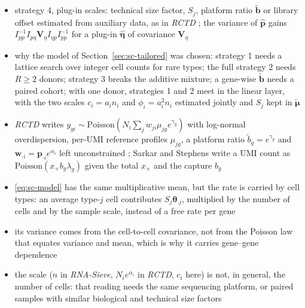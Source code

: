 \begin{itemize}
        negatively correlated; the target becomes RNA fractions \cite{aitchisonStatisticalAnalysisCompositional1982}
  \item strategy 4, plug-in scales: technical size factor, \(S_{j}\), platform ratio \(\tilde{\boldsymbol{b}}\) or library offset
        estimated from auxiliary data, as in \emph{RCTD} \cite{cableRobustDecompositionCell2022a}; the variance of
        \(\hat{\boldsymbol{p}}\) gains \(I_{pp}^{-1}I_{p\eta}\boldsymbol{V}_{\eta}I_{\eta p}I_{pp}^{-1}\) for a plug-in
        \(\hat{\boldsymbol{\eta}}\) of covariance \(\boldsymbol{V}_{\eta}\)
  \item why the model of Section~\ref{sec:sc-tailored} was chosen: strategy 1 needs a lattice search over integer
        cell counts for rare types; the full strategy 2 needs \(R\ge2\) donors; strategy 3 breaks the additive
        mixture; a gene-wise \(\tilde{\boldsymbol{b}}\) needs a paired cohort; with one donor, strategies 1 and 2 meet in the
        linear layer, with the two scales \(c_{i}=a_{i}n_{i}\) and \(\phi_{i}=a_{i}^{2}n_{i}\) estimated jointly and \(S_{j}\)
        kept in \(\tilde{\boldsymbol{\mu}}\)
\end{itemize}

\begin{remark}
  \label{rem:poisson-link}
  \begin{itemize}
    \item \emph{RCTD} writes \(y_{gi}\sim\mathrm{Poisson}(N_{i}\sum_{j}w_{ji}\mu_{jg}e^{\gamma_{g}})\) with
          log-normal overdispersion, per-UMI reference profiles \(\mu_{jg}\), a platform ratio
          \(\tilde b_{g}=e^{\gamma_{g}}\) and \(\boldsymbol{w}_{\cdot i}=\boldsymbol{p}_{\cdot i}e^{\alpha_{i}}\) left unconstrained
          \cite{cableRobustDecompositionCell2022a}; Sarkar and Stephens write a UMI count as
          \(\mathrm{Poisson}(x_{+}b_{g}\lambda_{g})\) given the total \(x_{+}\) and the capture \(b_{g}\)
          \cite{sarkarSeparatingMeasurementExpression2021}
    \item \eqref{eq:sc-model} has the same multiplicative mean, but the rate is carried by cell types: an
          average type-\(j\) cell contributes \(S_{j}\boldsymbol{\theta}_{\cdot j}\), multiplied by the number of cells and by
          the sample scale, instead of a free rate per gene
    \item its variance comes from the cell-to-cell covariance, not from the Poisson law that equates
          variance and mean, which is why it carries gene--gene dependence
    \item the scale (\(n\) in \emph{RNA-Sieve}, \(N_{i}e^{\alpha_{i}}\) in \emph{RCTD}, \(c_{i}\) here) is not, in
          general, the number of cells: that reading needs the same sequencing platform, or paired samples
          with similar biological and technical size factors
  \end{itemize}
\end{remark}


